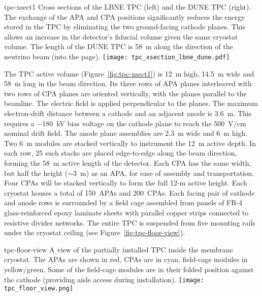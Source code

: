 \begin{cdrfigure}{tpc-xsect1}
{Cross sections of the LBNE  TPC (left) and the DUNE  TPC (right).  
The exchange of the APA and CPA positions significantly reduces the energy 
stored in the TPC by eliminating the two ground-facing cathode planes. 
This allows an increase in the detector's fiducial volume given the same cryostat volume. %
The length of the DUNE TPC is  58~m along the direction of the neutrino beam (into the page).}
\texttt{[image: tpc\_xsection\_lbne\_dune.pdf]}
\end{cdrfigure}
The TPC active volume (Figure~\ref{fig:tpc-xsect1}) is 12~m high,
14.5~m wide and 58~m long in the beam direction.  
Its three rows of APA planes interleaved with two rows of CPA planes
are oriented vertically, with the planes parallel to the beamline. The
electric field is applied perpendicular to the planes.  The maximum
electron-drift distance between a cathode and an adjacent anode is
3.6~m. This requires a $-$180~kV bias voltage on the cathode plane to
reach the 500~V/cm nominal drift field. The anode plane assemblies are
2.3~m wide and 6~m high. Two 6~m modules are stacked vertically to
instrument the 12~m active depth. In each row, 25 such stacks are
placed edge-to-edge along the beam direction, forming the 58~m active
length of the detector.  Each CPA has the same width, but half the
height ($\sim$3~m) as an APA, for ease of assembly and transportation.
Four CPAs will be stacked vertically to form the full 12-m active
height.  Each cryostat houses a total of 150~APAs and 200~CPAs.  Each
facing pair of cathode and anode rows is surrounded by a field
cage assembled from panels of FR-4 glass-reinforced epoxy laminate
sheets with parallel copper strips connected to resistive divider
networks.  The entire TPC is suspended from five mounting rails under the
cryostat ceiling (see Figure~\ref{fig:tpc-floor-view}).

\begin{cdrfigure}{tpc-floor-view}
{A view of the partially installed TPC inside the membrane cryostat.
  The APAs are shown in red, CPAs are in cyan, field-cage modules in
  yellow/green.  Some of the field-cage modules are in their folded
  position against the cathode (providing aisle access during installation).}
\texttt{[image: tpc\_floor\_view.png]}
\end{cdrfigure}

